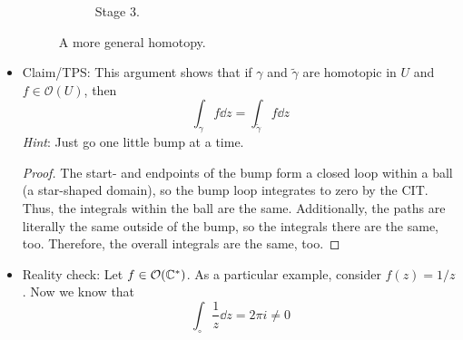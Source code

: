 \documentclass[../notes.tex]{subfiles}
\begin{document}
\begin{itemize}
\begin{figure}[h!]
\begin{subfigure}[b]{0.33\linewidth}
            \caption{Stage 3.}
            \label{fig:homotopicGeneralc}
        \end{subfigure}
        \caption{A more general homotopy.}
        \label{fig:homotopicGeneral}
    \end{figure}
    \item Claim/TPS: This argument shows that if $\gamma$ and $\tilde{\gamma}$ are homotopic in $U$ and $f\in\mathcal{O}(U)$, then
    \begin{equation*}
        \int_\gamma f\dd{z} = \int_{\tilde{\gamma}}f\dd{z}
    \end{equation*}
    \emph{Hint}: Just go one little bump at a time.
    \begin{proof}
        The start- and endpoints of the bump form a closed loop within a ball (a star-shaped domain), so the bump loop integrates to zero by the CIT. Thus, the integrals within the ball are the same. Additionally, the paths are literally the same outside of the bump, so the integrals there are the same, too. Therefore, the overall integrals are the same, too.
    \end{proof}
    \item Reality check: Let $f\in\mathcal{O}(\mathbb{C}^*)$. As a particular example, consider $f(z)=1/z$. Now we know that
    \begin{equation*}
        \int_\circ\frac{1}{z}\dd{z} = 2\pi i \neq 0
    \end{equation*}

\end{itemize}
\end{document}
